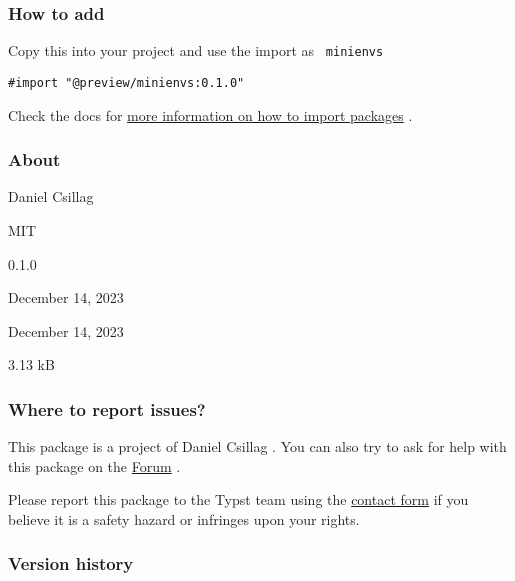 \subsubsection{How to add}\label{how-to-add}

Copy this into your project and use the import as \texttt{\ minienvs\ }

\begin{verbatim}
#import "@preview/minienvs:0.1.0"
\end{verbatim}



Check the docs for
\href{https://typst.app/docs/reference/scripting/\#packages}{more
information on how to import packages} .

\subsubsection{About}\label{about}

\begin{description}
\tightlist
\item[Author :]
Daniel Csillag
\item[License:]
MIT
\item[Current version:]
0.1.0
\item[Last updated:]
December 14, 2023
\item[First released:]
December 14, 2023
\item[Archive size:]
3.13 kB
\href{https://packages.typst.org/preview/minienvs-0.1.0.tar.gz}{\pandocbounded{}}
\end{description}

\subsubsection{Where to report issues?}\label{where-to-report-issues}

This package is a project of Daniel Csillag . You can also try to ask
for help with this package on the \href{https://forum.typst.app}{Forum}
.

Please report this package to the Typst team using the
\href{https://typst.app/contact}{contact form} if you believe it is a
safety hazard or infringes upon your rights.

\label{versions}
\subsubsection{Version history}\label{version-history}

